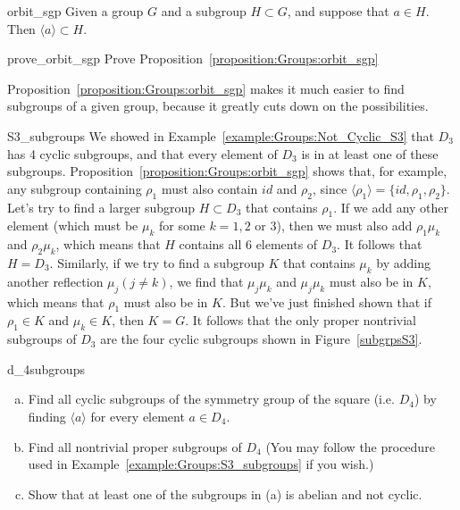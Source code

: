 \begin{prop}{orbit_sgp}
Given a group $G$ and a subgroup $H \subset G$, and suppose that $a \in H$.  Then $\langle a \rangle \subset H$.
\end{prop}

\begin{exercise}{prove_orbit_sgp}
Prove Proposition~\ref{proposition:Groups:orbit_sgp}
\end{exercise}

Proposition~\ref{proposition:Groups:orbit_sgp} makes it much easier to find subgroups of a given group, because it greatly cuts down
on the possibilities.

\begin{example}{S3_subgroups}
We showed in Example~\ref{example:Groups:Not_Cyclic_S3} that $D_3$ has 4 cyclic subgroups, and that every element of $D_3$ is in at least one of these subgroups.  Proposition~\ref{proposition:Groups:orbit_sgp} shows that, for example, any subgroup containing $\rho_1$ must also contain $id$ and  $\rho_2$, since $\langle \rho_1 \rangle = \{id, \rho_1, \rho_2\}$.  Let's try to find a larger subgroup $H \subset D_3$ that contains $\rho_1$.  If we add any other element  (which must be  $\mu_k$ for some $k=1,2$ or $3$), then we must also add $\rho_1 \mu_k$ and $\rho_2 \mu_k$, which means that $H$ contains  all 6 elements of $D_3$. It follows that $H=D_3$. Similarly, if we try to find a subgroup $K$ that contains $\mu_k$ by adding another reflection $\mu_j (j \neq k)$, we find that $\mu_j \mu_k$ and $\mu_j \mu_k$  must also be in $K$, which means that $\rho_1$ must also be in $K$. But we've just finished shown that if $\rho_1 \in K$ and $\mu_k \in K$, then  $K=G$.  It follows that the only proper nontrivial subgroups of $D_3$ are the four cyclic subgroups shown in Figure~\ref{subgrpsS3}.
\end{example}

\begin{exercise}{d_4subgroups}
\begin{enumerate}[(a)]
\item
Find all cyclic subgroups of  the symmetry group of the square (i.e. $D_4$)  by finding $\langle a \rangle$ for every element $a \in D_4$.
\item
Find all nontrivial proper subgroups of $D_4$  (You may follow the procedure used in Example~\ref{example:Groups:S3_subgroups} if you wish.) 
\item
Show that at least one of the subgroups in (a)  is abelian and not cyclic.
\end{enumerate}
\end{exercise}      

